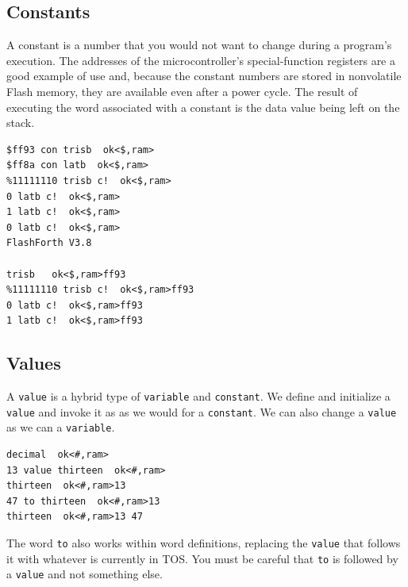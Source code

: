 \documentclass[12pt,a4paper]{article}
\begin{document}
% 


\medskip
\subsection{Constants}
\label{sec:constants}
%
A constant is a number that you would not want to change during a program's execution.
The addresses of the microcontroller's special-function registers are a good example 
of use and, because the constant numbers are stored in nonvolatile Flash memory, they are
available even after a power cycle.
The result of executing the word associated with a constant is the data value being left on the stack.
\begin{verbatim}
$ff93 con trisb  ok<$,ram> 
$ff8a con latb  ok<$,ram>
%11111110 trisb c!  ok<$,ram>
0 latb c!  ok<$,ram>
1 latb c!  ok<$,ram>
0 latb c!  ok<$,ram>
FlashForth V3.8

trisb   ok<$,ram>ff93 
%11111110 trisb c!  ok<$,ram>ff93 
0 latb c!  ok<$,ram>ff93 
1 latb c!  ok<$,ram>ff93 
\end{verbatim}


\medskip
\subsection{Values}
\label{sec:values}
%
A \verb!value! is a hybrid type of \verb!variable! and \verb!constant!.
We define and initialize a \verb!value! and invoke it as as we would for a \verb!constant!.
We can also change a \verb!value! as we can a \verb!variable!.
\begin{verbatim}
decimal  ok<#,ram>
13 value thirteen  ok<#,ram>
thirteen  ok<#,ram>13 
47 to thirteen  ok<#,ram>13 
thirteen  ok<#,ram>13 47 
\end{verbatim}
The word \verb!to! also works within word definitions, replacing the \verb!value! that
follows it with whatever is currently in TOS.
You must be careful that \verb!to! is followed by a \verb!value! and not something else.
\end{document}
